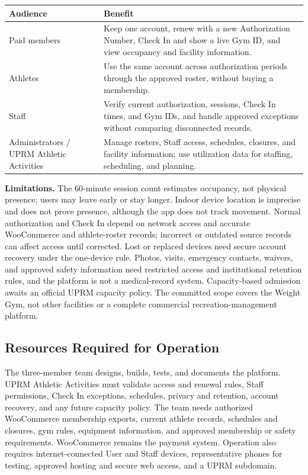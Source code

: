 \documentclass[11pt,letterpaper]{article}
\begin{document}
\begin{center}
\small
\begin{tabularx}{0.95\textwidth}{L{3.2cm} X}
\toprule
\textbf{Audience} & \textbf{Benefit} \\
\midrule
Paid members & Keep one account, renew with a new Authorization Number, Check In and show a live Gym ID, and view occupancy and facility information. \\
Athletes & Use the same account across authorization periods through the approved roster, without buying a membership. \\
Staff & Verify current authorization, sessions, Check In times, and Gym IDs, and handle approved exceptions without comparing disconnected records. \\
Administrators / UPRM Athletic Activities & Manage rosters, Staff access, schedules, closures, and facility information; use utilization data for staffing, scheduling, and planning. \\
\bottomrule
\end{tabularx}
\end{center}

\textbf{Limitations.} The 60-minute session count estimates occupancy, not physical presence; users may leave early or stay longer. Indoor device location is imprecise and does not prove presence, although the app does not track movement. Normal authorization and Check In depend on network access and accurate WooCommerce and athlete-roster records; incorrect or outdated source records can affect access until corrected. Lost or replaced devices need secure account recovery under the one-device rule. Photos, visits, emergency contacts, waivers, and approved safety information need restricted access and institutional retention rules, and the platform is not a medical-record system. Capacity-based admission awaits an official UPRM capacity policy. The committed scope covers the Weight Gym, not other facilities or a complete commercial recreation-management platform.

\subsection{Resources Required for Operation}

The three-member team designs, builds, tests, and documents the platform. UPRM Athletic Activities must validate access and renewal rules, Staff permissions, Check In exceptions, schedules, privacy and retention, account recovery, and any future capacity policy. The team needs authorized WooCommerce membership exports, current athlete records, schedules and closures, gym rules, equipment information, and approved membership or safety requirements. WooCommerce remains the payment system. Operation also requires internet-connected User and Staff devices, representative phones for testing, approved hosting and secure web access, and a UPRM subdomain.
\end{document}
